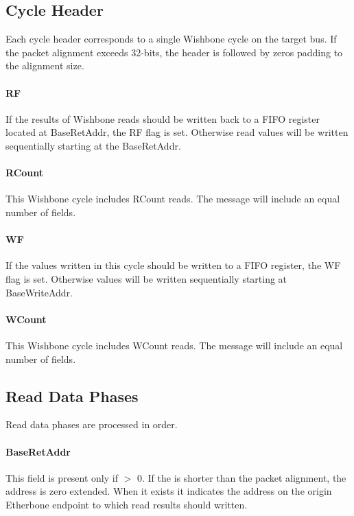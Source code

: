 \documentclass{article}
\begin{document}
\subsection{Cycle Header}

Each cycle header corresponds to a single Wishbone cycle on the target bus.
If the packet alignment exceeds 32-bits, 
the header is followed by zeros padding to the alignment size.

\paragraph{RF} \label{field:RF}
If the results of Wishbone reads should be written back to a FIFO register
located at BaseRetAddr, the RF flag is set.
Otherwise read values will be written sequentially starting at the
BaseRetAddr.

\paragraph{RCount} \label{field:RCount}
This Wishbone cycle includes RCount reads.
The message will include an equal number of  fields.

\paragraph{WF} \label{field:WF}
If the values written in this cycle should be written to a FIFO register,
the WF flag is set.
Otherwise values will be written sequentially starting at BaseWriteAddr.

\paragraph{WCount} \label{field:WCount}
This Wishbone cycle includes WCount reads.
The message will include an equal number of  fields.

\subsection{Read Data Phases}

Read data phases are processed in order.

\paragraph{BaseRetAddr} \label{field:BaseRetAddr}
This field is present only if  $>$ 0.
If the  is shorter than the packet alignment, 
the address is zero extended.
When it exists it indicates the address on the origin Etherbone endpoint 
to which read results should written.
\end{document}

